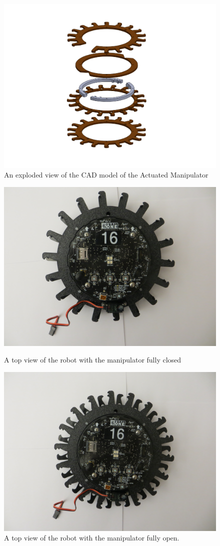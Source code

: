 \documentclass[12pt,onecolumn]{report}
\begin{document}
\begin{figure}[ht]
\begin{center}
\includegraphics[width=.5\linewidth]{./Figs/final_assembly_explodedisometric.pdf}
\end{center}
\caption{An exploded view of the CAD model of the Actuated Manipulator}
\label{fig:explode}
\end{figure}

\begin{figure}[ht]
\begin{minipage}[b]{0.45\linewidth}
\centering
\includegraphics[width=.45\linewidth]{./Figs/top_closed.jpg}
\caption{A top view of the robot with the manipulator fully closed}
\label{fig:closed}
\end{minipage}
\hspace{0.5cm}
\begin{minipage}[b]{0.45\linewidth}
\centering
\includegraphics[width=0.45\linewidth]{./Figs/top_open.jpg}
\caption{A top view of the robot with the manipulator fully open.}
\label{fig:open}
\end{minipage}
\end{figure}
\end{document}
